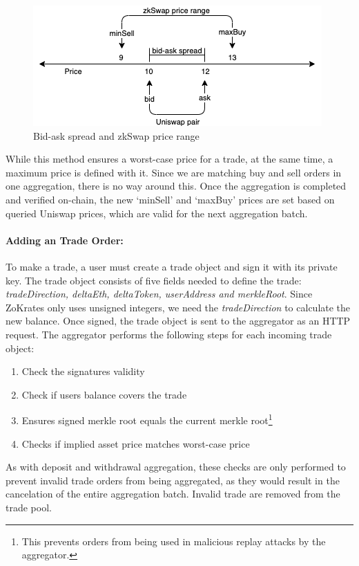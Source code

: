 \documentclass[../../thesis.tex]{subfiles}
\begin{document}
\begin{figure}[h]
    \centerline{\includegraphics[totalheight=3cm]{diagrams/priceing.png}}
    \caption{Bid-ask spread and zkSwap price range}
    \label{fig:price}
\end{figure}

While this method ensures a worst-case price for a trade, at the same time, a maximum price is defined with it. Since we are matching buy and sell orders in one aggregation, there is no way around this. Once the aggregation is completed and verified on-chain, the new `minSell' and `maxBuy' prices are set based on queried Uniswap prices, which are valid for the next aggregation batch.

\paragraph{Adding an Trade Order:}
To make a trade, a user must create a trade object and sign it with its private key. The trade object consists of five fields needed to define the trade: \textit{tradeDirection, deltaEth, deltaToken, userAddress and merkleRoot}. Since ZoKrates only uses unsigned integers, we need the \textit{tradeDirection} to calculate the new balance. Once signed, the trade object is sent to the aggregator as an HTTP request. The aggregator performs the following steps for each incoming trade object:
\begin{enumerate}
    \item Check the signatures validity
    \item Check if users balance covers the trade
    \item Ensures signed merkle root equals the current merkle root\footnote{This prevents orders from being used in malicious replay attacks by the aggregator.}
    \item Checks if implied asset price matches worst-case price
\end{enumerate}

As with deposit and withdrawal aggregation, these checks are only performed to prevent invalid trade orders from being aggregated, as they would result in the cancelation of the entire aggregation batch. Invalid trade are removed from the trade pool. 
\end{document}
